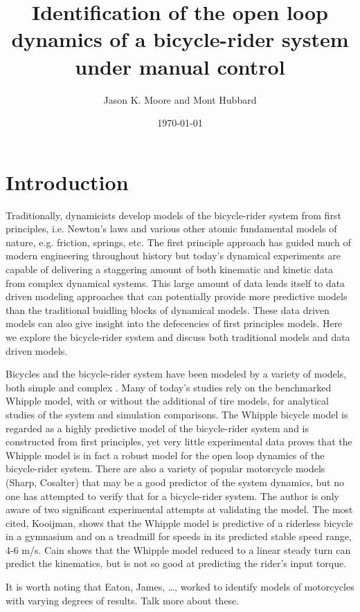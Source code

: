 \documentclass[a4paper]{article}
\title{Identification of the open loop dynamics of a bicycle-rider system
under manual control}
\author{Jason K. Moore and Mont Hubbard}
\date{\today}
\begin{document}
\maketitle

\section{Introduction}

Traditionally, dynamicists develop models of the bicycle-rider system from
first principles, i.e. Newton's laws and various other atomic fundamental
models of nature, e.g. friction, springs, etc. The first principle approach has
guided much of modern engineering throughout history but today's dynamical
experiments are capable of delivering a staggering amount of both kinematic and
kinetic data from complex dynamical systems. This large amount of data lends
itself to data driven modeling approaches that can potentially provide more
predictive models than the traditional buidling blocks of dynamical models.
These data driven models can also give insight into the defecencies of first
principles models. Here we explore the bicycle-rider system and discuss both
traditional models and data driven models.

Bicycles and the bicycle-rider system have been modeled by a variety of models,
both simple \cite{Timoshenko1948} and complex \cite{Sharp1971}. Many of
today's studies rely on the benchmarked Whipple model, with or without the
additional of tire models, for analytical studies of the system and simulation
comparisons. The Whipple bicycle model is regarded as a highly predictive model
of the bicycle-rider system and is constructed from first principles, yet very
little experimental data proves that the Whipple model is in fact a robust
model for the open loop dynamics of the bicycle-rider system. There are also a
variety of popular motorcycle models (Sharp, Cosalter) that may be a good
predictor of the system dynamics, but no one has attempted to verify that for a
bicycle-rider system. The author is only aware of two significant experimental
attempts at validating the model. The most cited, Kooijman, shows that the
Whipple model is predictive of a riderless bicycle in a gymnasium and on
a treadmill for speeds in its predicted stable speed range, 4-6 m/s. Cain shows
that the Whipple model reduced to a linear steady turn can predict the
kinematics, but is not so good at predicting the rider's input torque.

It is worth noting that Eaton, James, \ldots, worked to identify models of
motorcycles with varying degrees of results. Talk more about these.
\end{document}
